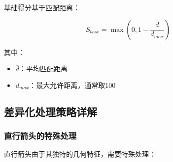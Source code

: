 \documentclass[12pt]{article}
\begin{document}
基础得分基于匹配距离：

\begin{equation}
S_{base} = \max(0, 1 - \frac{\bar{d}}{d_{max}})
\end{equation}

其中：
\begin{itemize}
    \item $\bar{d}$：平均匹配距离
    \item $d_{max}$：最大允许距离，通常取100
\end{itemize}

\subsection{差异化处理策略详解}

\subsubsection{直行箭头的特殊处理}

直行箭头由于其独特的几何特征，需要特殊处理：
\end{document}
